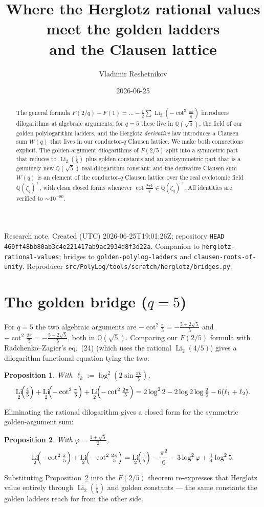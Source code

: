 \documentclass[11pt]{article}
\title{Where the Herglotz rational values meet the golden ladders\\ and the Clausen lattice}
\author{Vladimir Reshetnikov}
\date{2026-06-25}
\DeclareMathOperator{\Li}{Li}
\theoremstyle{plain}\newtheorem{proposition}{Proposition}
\theoremstyle{remark}\newtheorem{remark}[proposition]{Remark}
\begin{document}
\maketitle
\begin{center}\small
Research note. Created (UTC) 2026-06-25T19:01:26Z; repository \texttt{HEAD}
\texttt{469ff48bb80ab3c4e221417ab9ac2934d8f3d22a}. Companion to
\texttt{herglotz-rational-values}; bridges to \texttt{golden-polylog-ladders} and
\texttt{clausen-roots-of-unity}. Reproducer
\texttt{src/PolyLog/tools/scratch/herglotz/bridges.py}.
\end{center}

\begin{abstract}
The general formula $F(2/q)-F(1)=\dots-\tfrac12\sum\Li_2(-\cot^2\tfrac{\pi k}q)$ introduces dilogarithms at
algebraic arguments; for $q=5$ these live in $\mathbb Q(\sqrt5)$, the field of our golden polylogarithm
ladders, and the Herglotz \emph{derivative} law introduces a Clausen sum $W(q)$ that lives in our
conductor-$q$ Clausen lattice. We make both connections explicit. The golden-argument dilogarithms of
$F(2/5)$ split into a symmetric part that reduces to $\Li_2(\tfrac15)$ plus golden constants and an
antisymmetric part that is a genuinely new $\mathbb Q(\sqrt5)$ real-dilogarithm constant; and the derivative
Clausen sum $W(q)$ is an element of the conductor-$q$ Clausen lattice over the real cyclotomic field
$\mathbb Q(\zeta_q)^+$, with clean closed forms whenever $\cot\frac{2\pi k}q\in\mathbb Q(\zeta_q)^+$. All
identities are verified to $\sim10^{-80}$.
\end{abstract}

\section{The golden bridge ($q=5$)}
For $q=5$ the two algebraic arguments are $-\cot^2\tfrac{\pi}{5}=-\tfrac{5+2\sqrt5}{5}$ and
$-\cot^2\tfrac{2\pi}{5}=-\tfrac{5-2\sqrt5}{5}$, both in $\mathbb Q(\sqrt5)$. Comparing our
$F(2/5)$ formula with Radchenko--Zagier's eq.~(24) (which uses the rational $\Li_2(4/5)$) gives a
dilogarithm functional equation tying the two:
\begin{proposition}\label{prop:bridge}
With $\ell_k:=\log^2(2\sin\tfrac{\pi k}5)$,
\[
  \Li_2\!\Bigl(\tfrac45\Bigr)+\Li_2\!\Bigl(-\cot^2\tfrac{\pi}{5}\Bigr)+\Li_2\!\Bigl(-\cot^2\tfrac{2\pi}{5}\Bigr)
  =2\log^2 2-2\log2\log\tfrac25-6(\ell_1+\ell_2).
\]
\end{proposition}
Eliminating the rational dilogarithm gives a closed form for the symmetric golden-argument sum:
\begin{proposition}\label{prop:goldensum}
With $\varphi=\tfrac{1+\sqrt5}2$,
\[
  \Li_2\!\Bigl(-\cot^2\tfrac{\pi}{5}\Bigr)+\Li_2\!\Bigl(-\cot^2\tfrac{2\pi}{5}\Bigr)
  =\Li_2\!\Bigl(\tfrac15\Bigr)-\frac{\pi^2}{6}-3\log^2\varphi+\tfrac14\log^2 5 .
\]
\end{proposition}
Substituting Proposition~\ref{prop:goldensum} into the $F(2/5)$ theorem re-expresses that Herglotz value
entirely through $\Li_2(\tfrac15)$ and golden constants --- the same constants the golden ladders reach for
from the other side.
\end{document}
